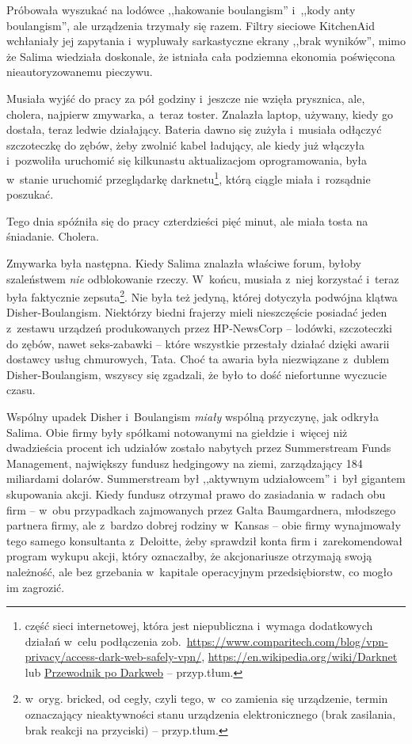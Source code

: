 \documentclass[oneside,polish,11pt,sfheadings]{mwbk}
\begin{document}
Próbowała wyszukać na lodówce ,,hakowanie boulangism'' i~,,kody anty
boulangism'', ale urządzenia trzymały się razem. Filtry sieciowe
KitchenAid wchłaniały jej zapytania i~wypluwały sarkastyczne ekrany
,,brak wyników'', mimo że Salima wiedziała doskonale, że istniała cała
podziemna ekonomia poświęcona nieautoryzowanemu pieczywu.

Musiała wyjść do pracy za pół godziny i~jeszcze nie wzięła prysznica,
ale, cholera, najpierw zmywarka, a~teraz toster. Znalazła laptop,
używany, kiedy go dostała, teraz ledwie działający. Bateria dawno się
zużyła i~musiała odłączyć szczoteczkę do zębów, żeby zwolnić kabel
ładujący, ale kiedy już włączyła i~pozwoliła uruchomić się kilkunastu
aktualizacjom oprogramowania, była w~stanie uruchomić przeglądarkę
darknetu\footnote{ część sieci internetowej, która jest niepubliczna i~wymaga
dodatkowych działań w~celu podłączenia
zob.~\url{https://www.comparitech.com/blog/vpn-privacy/access-dark-web-safely-vpn/}, \url{https://en.wikipedia.org/wiki/Darknet} lub \href{https://www.webhostingsecretrevealed.net/pl/blog/web-tools/tourist-guide-to-dark-web-accessing-the-dark-web-tor-browser-and-onion-websites/}{Przewodnik po Darkweb}
 -- przyp.tłum.}, którą ciągle miała i~rozsądnie poszukać.

Tego dnia spóźniła się do pracy czterdzieści pięć minut, ale miała tosta
na śniadanie. Cholera.

Zmywarka była następna. Kiedy Salima znalazła właściwe forum, byłoby
szaleństwem \textit{nie} odblokowanie rzeczy. W~końcu, musiała z~niej
korzystać i~teraz była faktycznie zepsuta\footnote{ w~oryg. bricked, od cegły,
czyli tego, w~co zamienia się urządzenie, termin oznaczający
nieaktywności stanu urządzenia elektronicznego (brak zasilania, brak
reakcji na przyciski) -- przyp.tłum.}. Nie była też jedyną, której
dotyczyła podwójna klątwa Disher-Boulangism. Niektórzy biedni frajerzy
mieli nieszczęście posiadać jeden z~zestawu urządzeń produkowanych przez
HP-NewsCorp -- lodówki, szczoteczki do zębów, nawet seks-zabawki -- które
wszystkie przestały działać dzięki awarii dostawcy usług chmurowych,
Tata. Choć ta awaria była niezwiązane z~dublem Disher-Boulangism,
wszyscy się zgadzali, że było to dość niefortunne wyczucie czasu.

Wspólny upadek Disher i~Boulangism \textit{miały} wspólną przyczynę, jak
odkryła Salima. Obie firmy były spółkami notowanymi na giełdzie i~więcej
niż dwadzieścia procent ich udziałów zostało nabytych przez Summerstream
Funds Management, największy fundusz hedgingowy na ziemi, zarządzający
184 miliardami dolarów. Summerstream był ,,aktywnym udziałowcem'' i~był
gigantem skupowania akcji. Kiedy fundusz otrzymał prawo do zasiadania w~radach obu firm -- w~obu przypadkach zajmowanych przez Galta
Baumgardnera, młodszego partnera firmy, ale z~bardzo dobrej rodziny w~Kansas -- obie firmy wynajmowały tego samego konsultanta z~Deloitte, żeby
sprawdził konta firm i~zarekomendował program wykupu akcji, który
oznaczałby, że akcjonariusze otrzymają swoją należność, ale bez
grzebania w~kapitale operacyjnym przedsiębiorstw, co mogło im zagrozić.
\end{document}
